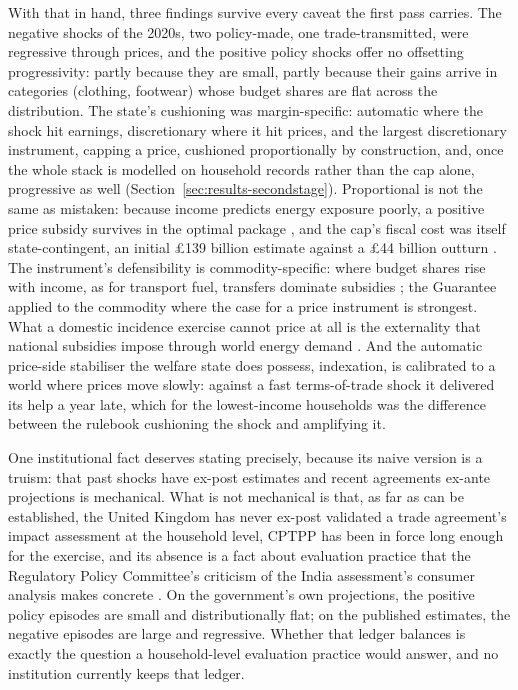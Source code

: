 With that in hand, three findings survive every caveat the first pass
carries. The
negative shocks of the 2020s, two policy-made, one
trade-transmitted, were regressive through prices, and the positive
policy shocks offer no offsetting progressivity: partly because they
are small, partly because their gains arrive in categories (clothing,
footwear) whose budget shares are flat across the distribution. The
state's cushioning was margin-specific: automatic where the shock hit
earnings, discretionary where it hit prices, and the largest
discretionary instrument, capping a price, cushioned proportionally by
construction, and, once the whole stack is modelled on household records rather than
the cap alone, progressive as well
(Section~\ref{sec:results-secondstage}). Proportional is not the same as
mistaken: because income predicts energy exposure poorly, a positive
price subsidy survives in the optimal package \citep{levell2025}, and
the cap's fiscal cost was itself state-contingent, an initial
\pounds 139 billion estimate against a \pounds 44 billion outturn
\citep{nao2024}. The instrument's defensibility is commodity-specific:
where budget shares rise with income, as for transport fuel, transfers
dominate subsidies \citep{bonnet2025}; the Guarantee applied to the
commodity where the case for a price instrument is strongest. What a
domestic incidence exercise cannot price at all is the externality
that national subsidies impose through world energy demand
\citep{auclert2023}. And the automatic price-side
stabiliser the welfare state does possess, indexation, is calibrated
to a world where prices move slowly: against a fast terms-of-trade
shock it delivered its help a year late, which for the lowest-income
households was the difference between the rulebook cushioning the
shock and amplifying it.

One institutional fact deserves stating precisely, because its naive
version is a truism: that past shocks have ex-post estimates and
recent agreements ex-ante projections is mechanical. What is not
mechanical is that, as far as can be established, the United Kingdom
has never ex-post validated a trade agreement's impact assessment at
the household level, CPTPP has
been in force long enough for the exercise, and its absence is a fact
about evaluation practice that the Regulatory Policy Committee's
criticism of the India assessment's consumer analysis makes concrete
\citep{rpc2026}. On the government's own projections, the positive
policy episodes are small and distributionally flat; on the published
estimates, the negative episodes are large and regressive. Whether
that ledger balances is exactly the question a household-level
evaluation practice would answer, and no institution currently keeps that ledger.

